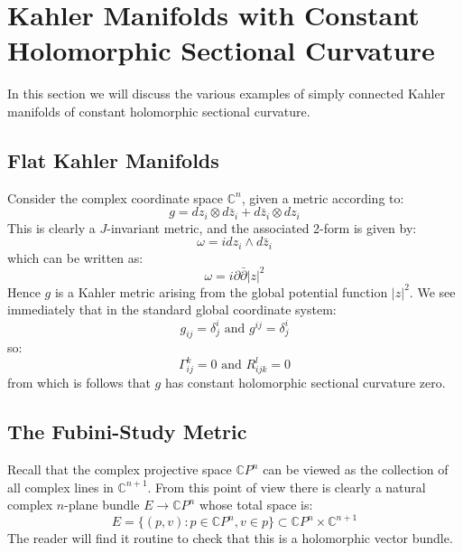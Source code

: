 \documentclass[11pt]{amsart}
\theoremstyle{definition}
\def \CP{ \mathbb{C}P }
\def \C{ \mathbb{C} }
\def \del{ \partial }
\def \delbar{ \bar{\partial} }
\begin{document}
\parskip 6pt
\parindent 0pt
\baselineskip 14pt

\section{ Kahler Manifolds with Constant Holomorphic Sectional Curvature }

In this section we will discuss the various examples of simply connected Kahler manifolds of constant holomorphic sectional curvature.

\subsection{Flat Kahler Manifolds}

Consider the complex coordinate space $\C^n$, given a metric according to:
%
$$ g = d z_i \otimes d \bar{z}_i + d \bar{z}_i \otimes d z_i $$
%
This is clearly a $J$-invariant metric, and the associated 2-form is given by:
%
$$ \omega = i d z_i \wedge d \bar{z}_i $$
%
which can be written as:
%
$$ \omega = i \del \delbar |z|^2 $$
%
Hence $g$ is a Kahler metric arising from the global potential function $|z|^2$.  We see immediately that in the standard global coordinate system:
%
$$ g_{ij} = \delta^i_j \text{ and } g^{ij} = \delta^i_j $$
%
so:
%
$$ \Gamma_{ij}^k = 0 \text{ and } R_{ijk}^l = 0 $$
%
from which is follows that $g$ has constant holomorphic sectional curvature zero.


\subsection{The Fubini-Study Metric}

Recall that the complex projective space $\CP^n$ can be viewed as the collection of all complex lines in $\C^{n+1}$.  From this point of view there is clearly a natural complex $n$-plane bundle $E \rightarrow \CP^n$ whose total space is:
%
$$ E = \{ (p,v) : p \in \CP^n, v \in p \} \subset \CP^n \times \C^{n+1} $$
%
The reader will find it routine to check that this is a holomorphic vector bundle.  
\end{document}
